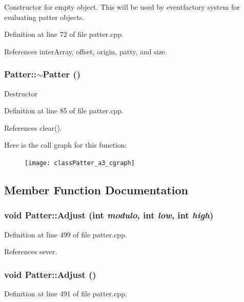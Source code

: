 Constructor for empty object. This will be used by eventfactory system for evaluating patter objects. 

Definition at line 72 of file patter.cpp.

References inter\-Array, offset, origin, patty, and size.
\subsubsection{\setlength{\rightskip}{0pt plus 5cm}Patter::$\sim${\bf Patter} ()}\label{classPatter_a3}


Destructor 

Definition at line 85 of file patter.cpp.

References clear().

Here is the call graph for this function:\begin{figure}[H]
\begin{center}
\leavevmode
\texttt{[image: classPatter\_a3\_cgraph]}
\end{center}
\end{figure}


\subsection{Member Function Documentation}
\subsubsection{\setlength{\rightskip}{0pt plus 5cm}void Patter::Adjust (int {\em modulo}, int {\em low}, int {\em high})\hspace{0.3cm}{\tt  [private]}}\label{classPatter_d13}




Definition at line 499 of file patter.cpp.

References sever.
\subsubsection{\setlength{\rightskip}{0pt plus 5cm}void Patter::Adjust ()\hspace{0.3cm}{\tt  [private]}}\label{classPatter_d12}




Definition at line 491 of file patter.cpp.

